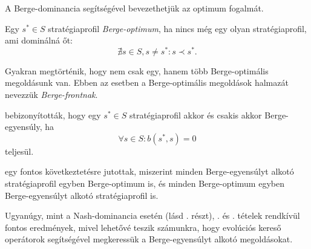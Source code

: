 A Berge-dominancia segítségével bevezethetjük az optimum fogalmát.

\begin{ert}
  Egy $s^* \in S$ stratégiaprofil \emph{Berge-optimum}, ha nincs még egy olyan stratégiaprofil, ami dominálná őt:
  \[
    \nexists s \in S, s \neq s^* \colon s \prec s^*.
  \]
\end{ert}


\begin{ert}
  Gyakran megtörténik, hogy nem csak egy, hanem több Berge-optimális megoldásunk van.
  Ebben az esetben a Berge-optimális megoldások halmazát nevezzük \emph{Berge-frontnak}.
\end{ert}


\begin{tet}\label{thm:PROFIL_BE_DOMINANCIAVAL}
   bebizonyították, hogy egy $s^* \in S$ stratégiaprofil akkor és csakis akkor Berge-egyensúly, ha
  \[
    \forall s \in S \colon b(s^*, s) = 0
  \]
  teljesül.
\end{tet}

\begin{tet}\label{thm:BE_EGYENLO_BF}
   egy fontos következtetésre jutottak, miszerint minden Berge-egyensúlyt alkotó stratégiaprofil egyben Berge-optimum is, és minden Berge-optimum egyben Berge-egyensúlyt alkotó stratégiaprofil is.
\end{tet}

\begin{meg}
  Ugyanúgy, mint a Nash-dominancia esetén (lásd . részt), . és . tételek rendkívül fontos eredmények, mivel lehetővé teszik számunkra, hogy evolúciós kereső operátorok segítségével megkeressük a Berge-egyensúlyt alkotó megoldásokat.
\end{meg}


